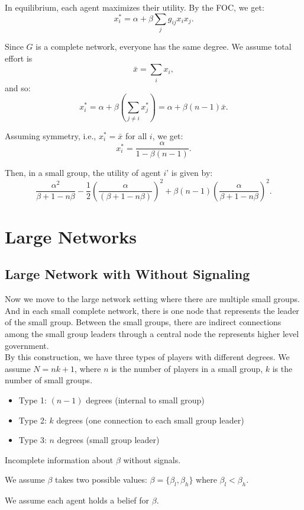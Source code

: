 \documentclass[12pt]{article}
\begin{document}
In equilibrium, each agent maximizes their utility. By the FOC, we get:
\[
x_i^* = \alpha + \beta \sum_j g_{ij}x_i x_j. \tag{2}
\]

Since $G$ is a complete network, everyone has the same degree. We assume total effort is  
\[
\bar{x} = \sum_i x_i,
\]
and so:
\[
x_i^* = \alpha + \beta \left( \sum_{j \neq i} x_j^* \right) = \alpha + \beta(n - 1)\bar{x}. \tag{3}
\]

Assuming symmetry, i.e., $x_i^* = \bar{x}$ for all $i$, we get:
\[
x_i^* = \frac{\alpha}{1 - \beta(n - 1)}.
\]

Then, in a small group, the utility of agent $i$' is given by:
\[
\frac{\alpha^2}{\beta + 1 - n\beta} - \frac{1}{2} \left( \frac{\alpha}{(\beta + 1 - n\beta)} \right)^2 + \beta(n - 1) \left( \frac{\alpha}{\beta + 1 - n\beta} \right)^2. \tag{4}
\]


\section{Large Networks}
\subsection{Large Network with Without Signaling}
Now we move to the large network setting where there are multiple small groups. And in each small complete network, there is one node that represents the leader of the small group. Between the small groups, there are indirect connections among the small group leaders through a central node the represents higher level government.\\
By this construction, we have three types of players with different degrees.  
We assume $N = nk + 1$, where $n$ is the number of players in a small group, $k$ is the number of small groups.

\begin{itemize}
    \item Type 1: $(n-1)$ degrees (internal to small group)
    \item Type 2: $k$ degrees (one connection to each small group leader)
    \item Type 3: $n$ degrees (small group leader)
\end{itemize}

Incomplete information about $\beta$ without signals.

We assume $\beta$ takes two possible values: $\beta = \{\beta_l,\beta_h\}$ where $\beta_l < \beta_h$. 

We assume each agent holds a belief for $\beta$.
\end{document}
